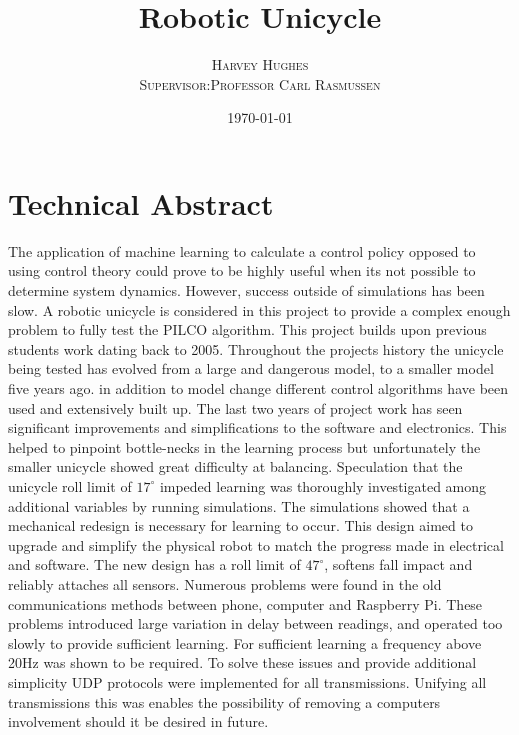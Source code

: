 \documentclass[twoside,twocolumn,12pt]{article}
\title{Robotic Unicycle} %
\author{%
\textsc{Harvey Hughes} \\
\textsc{Supervisor:Professor Carl Rasmussen} \\
}
\date{\today} %
\begin{document}
\maketitle


\section*{Technical Abstract}
The application of machine learning to calculate a control policy opposed to using control theory could prove to be highly useful when its not possible to determine system dynamics. However, success outside of simulations has been slow. A robotic unicycle is considered in this project to provide a complex enough problem to fully test the PILCO algorithm. 
\newline
This project builds upon previous students work dating back to 2005. Throughout the projects history the unicycle being tested has evolved from a large and dangerous model, to a smaller model five years ago. in addition to model change different control algorithms have been used and extensively built up. 
\newline
The last two years of project work has seen significant improvements and simplifications to the software and electronics. This helped to pinpoint bottle-necks in the learning process but unfortunately the smaller unicycle showed great difficulty at balancing.
\newline
Speculation that the unicycle roll limit of $17^{\circ}$ impeded learning was thoroughly investigated among additional variables by running simulations. The simulations showed that a mechanical redesign is necessary for learning to occur. This design aimed to upgrade and simplify the physical robot to match the progress made in electrical and software. The new design has a roll limit of $47^{\circ}$, softens fall impact and reliably attaches all sensors. 
\newline
Numerous problems were found in the old communications methods between phone, computer and Raspberry Pi. These problems introduced large variation in delay between readings, and operated too slowly to provide sufficient learning. For sufficient learning a frequency above 20Hz was shown to be required. To solve these issues and provide additional simplicity UDP protocols were implemented for all transmissions. Unifying all transmissions this was enables the possibility of removing a computers involvement should it be desired in future.
\end{document}
